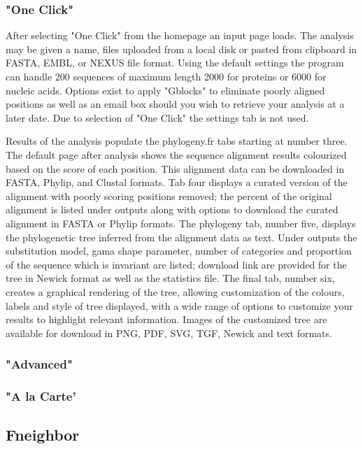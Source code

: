         \subsubsection{"One Click"}

        After selecting "One Click" from the homepage an input page loads. The analysis may be given a name, files uploaded from a local disk or pasted from clipboard in FASTA, EMBL, or NEXUS file format. Using the default settings the program can handle 200 sequences of maximum length 2000 for proteins or 6000 for nucleic acids. Options exist to apply "Gblocks" to eliminate poorly aligned positions as well as an email box should you wish to retrieve your analysis at a later date. Due to selection of "One Click" the settings tab is not used.

        Results of the analysis populate the phylogeny.fr tabs starting at number three. The default page after analysis shows the sequence alignment results colourized based on the score of each position. This alignment data can be downloaded in FASTA, Phylip, and Clustal formats. Tab four displays a curated version of the alignment with poorly scoring positions removed; the percent of the original alignment is listed under outputs along with options to download the curated alignment in FASTA or Phylip formats. The phylogeny tab, number five, displays the phylogenetic tree inferred from the alignment data as text. Under outputs the substitution model, gama shape parameter, number of categories and proportion of the sequence which is invariant are listed; download link are provided for the tree in Newick format as well as the statistics file. The final tab, number six, creates a graphical rendering of the tree, allowing customization of the colours, labels and style of tree displayed, with a wide range of options to customize your results to highlight relevant information. Images of the customized tree are available for download in PNG, PDF, SVG, TGF, Newick and text formats.

        \subsubsection{"Advanced"}

        \subsubsection{"A la Carte'}
    
    \subsection{Fneighbor}
    
